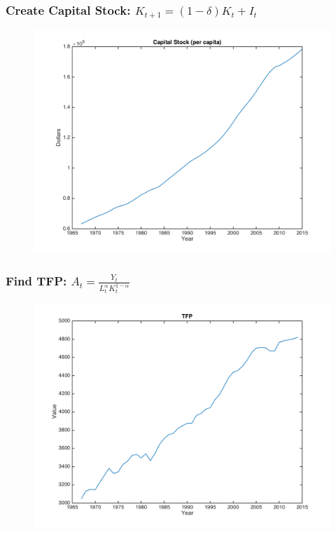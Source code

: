\documentclass{beamer}
\begin{document}
\begin{frame}
\frametitle[alignment=center]{Create Capital Stock: $K_{t+1}=(1-\delta)K_t+I_t$}
\begin{figure}
\centering
\includegraphics[scale=0.5]{Figure_3.png}
\end{figure}
\end{frame}

\begin{frame}
\frametitle[alignment=center]{Find TFP: $A_t=\frac{Y_t}{L_t^\alpha K_t^{1-\alpha}}$}
\begin{figure}
\centering
\includegraphics[scale=0.5]{Figure_4.png}
\end{figure}
\end{frame}
\end{document}
